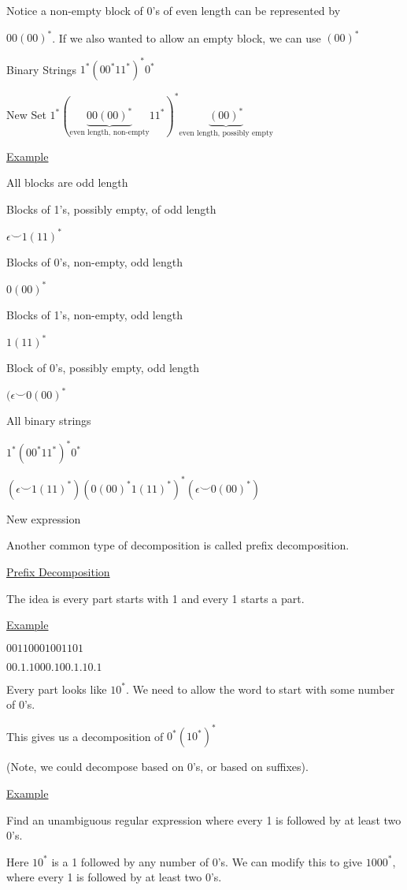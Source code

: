 \documentclass{article}
\begin{document}
Notice a non-empty block of $0$'s of even length can be represented by 

$00(00)^*$. If we also wanted to allow an empty block, we can use $(00)^*$

Binary Strings $1^*(00^*11^*)^*0^*$

New Set $1^*(\underbrace{00(00)^*}_{\text{even length, non-empty}}11^*)^*\underbrace{(00)^*}_{\text{even length, possibly empty}}$

\underline{Example}

All blocks are odd length

Blocks of 1's, possibly empty, of odd length

$\epsilon \smile 1(11)^*$

Blocks of 0's, non-empty, odd length

$0(00)^*$

Blocks of 1's, non-empty, odd length

$1(11)^*$

Block of 0's, possibly empty, odd length

$(\epsilon \smile 0(00)^*$

All binary strings

$1^*(00^*11^*)^*0^*$

$(\epsilon \smile 1(11)^*)(0(00)^*1(11)^*)^*(\epsilon \smile 0(00)^*)$

New expression

Another common type of decomposition is called prefix decomposition.

\underline{Prefix Decomposition}


The idea is every part starts with 1 and every 1 starts a part.

\underline{Example}

$00110001001101$

$00.1.1000.100.1.10.1$

Every part looks like $10^*$. We need to allow the word to start with some number of 0's. 

This gives us a decomposition of $0^*(10^*)^*$

(Note, we could decompose based on 0's, or based on suffixes). 

\underline{Example}

Find an unambiguous regular expression where every 1 is followed by at least two 0's. 

Here $10^*$ is a 1 followed by any number of 0's. We can modify this to give $1000^*$, where every 1 is followed by at least two 0's. 
\end{document}
